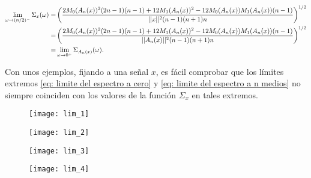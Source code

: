 \begin{align*}
\lim\limits_{\omega \rightarrow (n/2)^{-}}{\Sigma_{x}(\omega)}
= &
\left(
\frac{
2M_{0}(A_{n}(x))^{2}(2n-1)(n-1) + 
12M_{1}(A_{n}(x))^{2} - 12M_{0}(A_{n}(x))
M_{1}(A_{n}(x))(n-1)
}{
||x||^{2} (n-1)(n+1)n}
\right)^{1/2} \\
= &
\left(
\frac{
2M_{0}(A_{n}(x))^{2}(2n-1)(n-1) + 
12M_{1}(A_{n}(x))^{2} - 12M_{0}(A_{n}(x))
M_{1}(A_{n}(x))(n-1)
}{
||A_{n}(x)||^{2} (n-1)(n+1)n}
\right)^{1/2} \\
= & 
\lim\limits_{\omega \rightarrow 0^{+}}{\Sigma_{A_{n}(x)}(\omega)}.
\end{align*}
\QEDB
\vspace{0.2cm}


Con unos ejemplos,
fijando a una señal $x$,
es fácil comprobar que los límites extremos 
\eqref{eq: limite del espectro a cero} y 
\eqref{eq: limite del espectro a n medios}
no siempre coinciden con los valores
de la función $\Sigma_{x}$ en tales extremos.



\begin{figure}[H]
	\centering
	\texttt{[image: lim\_1]} 
\end{figure}	

\begin{figure}[H]
	\centering
	\texttt{[image: lim\_2]} 
\end{figure}

\begin{figure}[H]
	\centering
	\texttt{[image: lim\_3]} 
\end{figure}

\begin{figure}[H]
	\centering
	\texttt{[image: lim\_4]} 
\end{figure}


